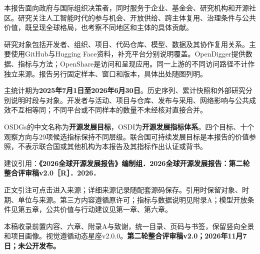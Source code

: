 \label{ch1-about}
本报告面向政府与国际组织决策者，同时服务于企业、基金会、研究机构和开源社区。研究关注人工智能时代的参与机会、开放供给、跨主体复用、治理条件与公共价值，既呈现全球格局，也考察不同地区和主体的具体贡献。

研究对象包括开发者、组织、项目、代码仓库、模型、数据及其协作复用关系。主要使用GitHub与Hugging Face资料，补充平台分别说明覆盖。OpenDigger提供数据、指标与方法；OpenShare是访问和呈现应用。同一上游的不同访问路径不计作独立来源。报告另行固定样本、窗口和版本，具体出处随图列明。

主统计期为\textbf{2025年7月1日至2026年6月30日}。历史序列、累计快照和外部研究分别说明时段与对象。开发者与活动、项目与仓库、发布与采用、网络影响与公共成效不互相等同；不同平台或不同样本的数量不未经核对直接合并。

OSDGs的中文名称为\textbf{开源发展目标}，OSDI为\textbf{开源发展指标体系}。四个目标、十个观察方向与29项候选指标保持不同层级。联合国可持续发展目标是本报告的价值参照，不表示联合国或其他机构为本报告及其指标作出认证或背书。

建议引用：\textbf{《2026全球开源发展报告》编制组．2026全球开源发展报告：第二轮整合评审稿v2.0［R］．2026．}

正文引注可点击进入来源；详细来源记录随配套源码保存。引用时保留对象、时期、单位与来源。第三方内容遵循原许可；指标与数据说明见附录A；模型开放条件见第五章，公共价值与行动建议见第一章、第六章。

本稿收录前置内容、六章、附录A与致谢，统一目录、页码与书签，保留竖向全景和项目画像。视觉遵循动态星座v2.0.0。\textbf{第二轮整合评审稿v2.0；2026年11月7日；未公开发布。}
\par\clearpage



